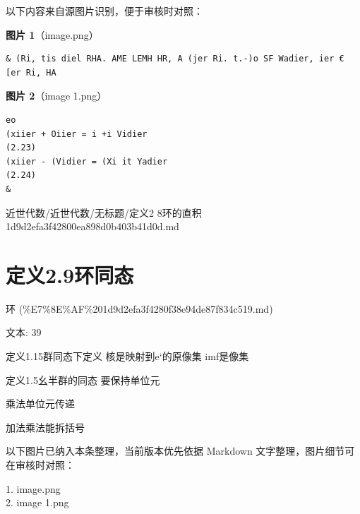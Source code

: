 \begin{note}
以下内容来自源图片识别，便于审核时对照：

\textbf{图片 1}（image.png）
\begin{Verbatim}[fontsize=\small]
& (Ri, tis diel RHA. AME LEMH HR, A (jer Ri. t.-)o SF Wadier, ier € [er Ri, HA
\end{Verbatim}

\textbf{图片 2}（image 1.png）
\begin{Verbatim}[fontsize=\small]
eo
(xiier + Oiier = i +i Vidier                                       (2.23)
(xiier - (Vidier = (Xi it Yadier                                     (2.24)
&
\end{Verbatim}

\end{note}

\begin{note}[来源路径]

近世代数/近世代数/无标题/定义2 8环的直积 1d9d2efa3f42800ea898d0b403b41d0d.md

\end{note}

\section*{定义2.9环同态}

\begin{note}[来源上级主题]

环 (\%E7\%8E\%AF\%201d9d2efa3f4280f38e94de87f834c519.md)

\end{note}

\begin{definition}[定义2.9环同态]

文本: 39

定义1.15群同态下定义 核是映射到e‘的原像集 imf是像集

定义1.5幺半群的同态 要保持单位元

乘法单位元传递

加法乘法能拆括号

\end{definition}

\begin{note}[关联图片]
以下图片已纳入本条整理，当前版本优先依据 Markdown 文字整理，图片细节可在审核时对照：

1. image.png\\
2. image 1.png\\

\end{note}

